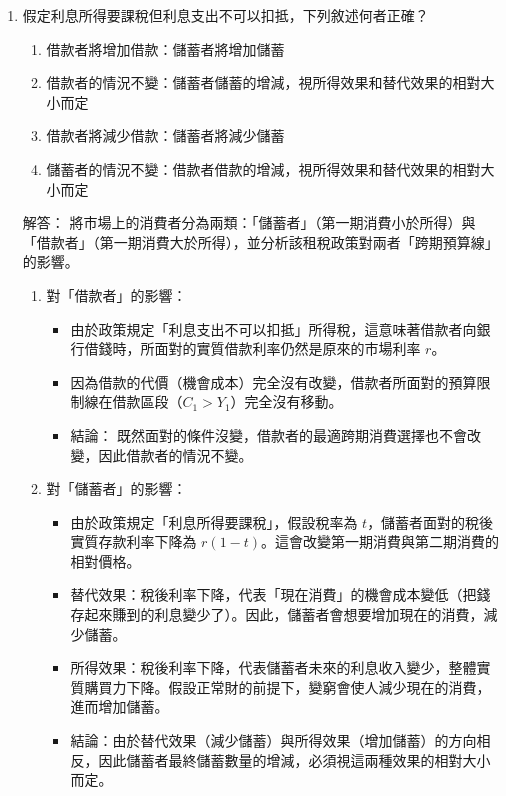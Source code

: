 \documentclass[12pt, a4paper]{article}
\begin{document}
\begin{enumerate}
    \item 假定利息所得要課稅但利息支出不可以扣抵，下列敘述何者正確？
    \begin{enumerate}[label=\Alph*.]
        \item 借款者將增加借款：儲蓄者將增加儲蓄
        \item 借款者的情況不變：儲蓄者儲蓄的增減，視所得效果和替代效果的相對大小而定
        \item 借款者將減少借款：儲蓄者將減少儲蓄
        \item 儲蓄者的情況不變：借款者借款的增減，視所得效果和替代效果的相對大小而定
    \end{enumerate}
    解答：
    將市場上的消費者分為兩類：「儲蓄者」（第一期消費小於所得）與「借款者」（第一期消費大於所得），並分析該租稅政策對兩者「跨期預算線」的影響。
    \begin{enumerate}[1.]
        \item 對「借款者」的影響：
        \begin{itemize}
            \item 由於政策規定「利息支出不可以扣抵」所得稅，這意味著借款者向銀行借錢時，所面對的實質借款利率仍然是原來的市場利率 \(r\)。
            \item 因為借款的代價（機會成本）完全沒有改變，借款者所面對的預算限制線在借款區段（\(C_1 > Y_1\)）完全沒有移動。
            \item 結論： 既然面對的條件沒變，借款者的最適跨期消費選擇也不會改變，因此借款者的情況不變。
        \end{itemize}
        \item 對「儲蓄者」的影響：
        \begin{itemize}
            \item 由於政策規定「利息所得要課稅」，假設稅率為 \(t\)，儲蓄者面對的稅後實質存款利率下降為 \(r(1-t)\)。這會改變第一期消費與第二期消費的相對價格。
            \item 替代效果：稅後利率下降，代表「現在消費」的機會成本變低（把錢存起來賺到的利息變少了）。因此，儲蓄者會想要增加現在的消費，減少儲蓄。
            \item 所得效果：稅後利率下降，代表儲蓄者未來的利息收入變少，整體實質購買力下降。假設正常財的前提下，變窮會使人減少現在的消費，進而增加儲蓄。
            \item 結論：由於替代效果（減少儲蓄）與所得效果（增加儲蓄）的方向相反，因此儲蓄者最終儲蓄數量的增減，必須視這兩種效果的相對大小而定。
        \end{itemize}
    \end{enumerate}


\end{enumerate}
\end{document}
